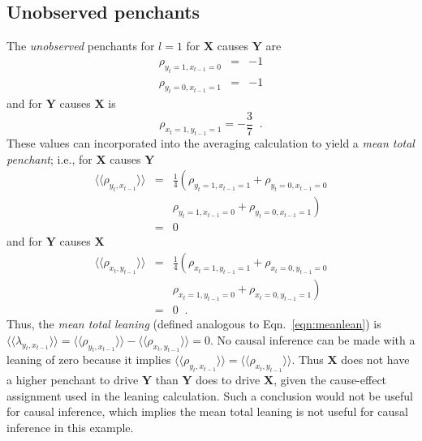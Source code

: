 \documentclass[twocolumn,aps,pre,groupedaddress]{revtex4-1}
\begin{document}
\subsection{Unobserved penchants}
The {\em unobserved} penchants for $l=1$ for $\mathbf{X}$ causes $\mathbf{Y}$ are
\begin{eqnarray*}
\rho_{y_t=1,x_{t-1}=0} &=& -1\\
\rho_{y_t=0,x_{t-1}=1} &=& -1
\end{eqnarray*}
and for $\mathbf{Y}$ causes $\mathbf{X}$ is
\begin{equation*}
\rho_{x_t=1,y_{t-1}=1}=-\frac{3}{7}\;\;.
\end{equation*}
These values can incorporated into the averaging calculation to yield a {\em mean total penchant}; i.e., for $\mathbf{X}$ causes $\mathbf{Y}$
\begin{eqnarray*}
\langle\langle \rho_{y_t,x_{t-1}} \rangle\rangle &=& \frac{1}{4}\left(\rho_{y_t=1,x_{t-1}=1} + \rho_{y_t=0,x_{t-1}=0}\right.\\
& &\left. \rho_{y_t=1,x_{t-1}=0} + \rho_{y_t=0,x_{t-1}=1}\right) \\
&=& 0
\end{eqnarray*}
and for $\mathbf{Y}$ causes $\mathbf{X}$
\begin{eqnarray*}
\langle\langle \rho_{x_t,y_{t-1}} \rangle\rangle &=& \frac{1}{4}\left(\rho_{x_t=1,y_{t-1}=1} + \rho_{x_t=0,y_{t-1}=0}\right.\\
& &\left. \rho_{x_t=1,y_{t-1}=0} + \rho_{x_t=0,y_{t-1}=1}\right)\\
&=& 0\;\;.
\end{eqnarray*}
Thus, the {\em mean total leaning} (defined analogous to Eqn.\ \ref{eqn:meanlean}) is $\langle\langle \lambda_{y_t,x_{t-1}} \rangle\rangle = \langle\langle \rho_{y_t,x_{t-1}} \rangle\rangle -  \langle\langle \rho_{x_t,y_{t-1}} \rangle\rangle = 0$.  No causal inference can be made with a leaning of zero because it implies $\langle\langle \rho_{y_t,x_{t-1}} \rangle\rangle =  \langle\langle \rho_{x_t,y_{t-1}} \rangle\rangle$.  Thus $\mathbf{X}$ does not have a higher penchant to drive $\mathbf{Y}$ than $\mathbf{Y}$ does to drive $\mathbf{X}$, given the cause-effect assignment used in the leaning calculation.  Such a conclusion would not be useful for causal inference, which implies the mean total leaning is not useful for causal inference in this example.
\end{document}
